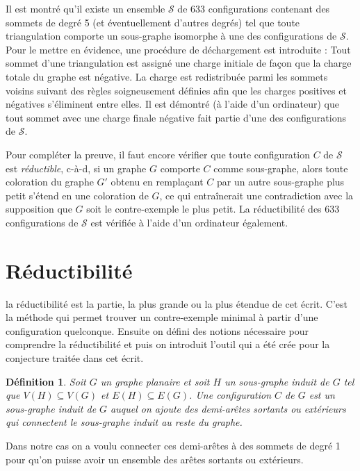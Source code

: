 \documentclass[10pt,a4paper]{article}
\newtheorem{definition}{Définition}
\begin{document}
Il est montré qu'il existe un ensemble $\mathcal{S}$ de 633 configurations contenant des sommets de degré 5 (et éventuellement d'autres degrés) tel que toute triangulation comporte un sous-graphe isomorphe à une des configurations de $\mathcal{S}$. Pour le mettre en évidence, une procédure de déchargement est introduite : Tout sommet d'une triangulation est assigné une charge initiale de façon que la charge totale du graphe est négative. La charge est redistribuée parmi les sommets voisins suivant des règles soigneusement définies afin que les charges positives et négatives s'éliminent entre elles. Il est démontré (à l'aide d'un ordinateur) que tout sommet avec une charge finale négative fait partie d'une des configurations de $\mathcal{S}$.

Pour compléter la preuve, il faut encore vérifier que toute configuration $C$ de $\mathcal{S}$ est \emph{réductible}, c-à-d, si un graphe $G$ comporte $C$ comme sous-graphe, alors toute coloration du graphe $G'$ obtenu en remplaçant $C$ par un autre sous-graphe plus petit s'étend en une coloration de $G$, ce qui entraînerait une contradiction avec la supposition que $G$ soit le contre-exemple le plus petit.
La réductibilité des 633 configurations de $\mathcal{S}$ est vérifiée à l'aide d'un ordinateur également.

\newpage





\section{Réductibilité}

la réductibilité est la partie, la plus grande ou la plus étendue de cet écrit. C'est la méthode qui permet trouver un contre-exemple minimal à partir d'une configuration quelconque. Ensuite on défini des notions nécessaire pour comprendre la réductibilité et puis on introduit l'outil qui a été crée pour la conjecture traitée dans cet écrit.

\begin{definition}
Soit $G$ un graphe planaire et soit $H$ un sous-graphe induit de $G$ tel que $V(H) \subseteq V(G)$ et $E(H) \subseteq E(G)$. Une \emph{configuration} $C$ de $G$ est un sous-graphe induit de $G$ auquel on ajoute des demi-arêtes sortants ou extérieurs qui connectent le sous-graphe induit au reste du graphe.
\label{de:conf}
\end{definition}

{\color{red} Dans notre cas on a voulu connecter ces demi-arêtes à des sommets de degré 1 pour qu'on puisse avoir un ensemble des arêtes sortants ou extérieurs.}
\end{document}
